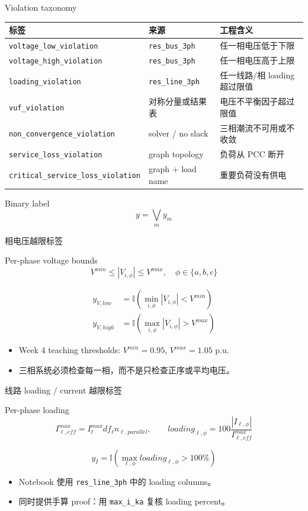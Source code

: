 \documentclass[aspectratio=169,11pt]{beamer}
\begin{document}
\begin{frame}{Violation taxonomy}
\scriptsize
\begin{tabular}{lll}
\toprule
标签 & 来源 & 工程含义 \\
\midrule
\texttt{voltage\_low\_violation} & \texttt{res\_bus\_3ph} & 任一相电压低于下限 \\
\texttt{voltage\_high\_violation} & \texttt{res\_bus\_3ph} & 任一相电压高于上限 \\
\texttt{loading\_violation} & \texttt{res\_line\_3ph} & 任一线路/相 loading 超过限值 \\
\texttt{vuf\_violation} & 对称分量或结果表 & 电压不平衡因子超过限值 \\
\texttt{non\_convergence\_violation} & solver / no slack & 三相潮流不可用或不收敛 \\
\texttt{service\_loss\_violation} & graph topology & 负荷从 PCC 断开 \\
\texttt{critical\_service\_loss\_violation} & graph + load name & 重要负荷没有供电 \\
\bottomrule
\end{tabular}
\vspace{0.3cm}

\begin{block}{Binary label}
\[
y=\bigvee_m y_m
\]
\end{block}
\end{frame}

\begin{frame}{相电压越限标签}
\begin{block}{Per-phase voltage bounds}
\[
V^{min}\le |V_{i,\phi}| \le V^{max},\quad \phi\in\{a,b,c\}
\]
\end{block}
\begin{align*}
y_{V,low}&=\mathbb{I}\left(\min_{i,\phi}|V_{i,\phi}|<V^{min}\right)\\
y_{V,high}&=\mathbb{I}\left(\max_{i,\phi}|V_{i,\phi}|>V^{max}\right)
\end{align*}
\begin{itemize}
  \item Week 4 teaching thresholds: $V^{min}=0.95$, $V^{max}=1.05$ p.u.
  \item 三相系统必须检查每一相，而不是只检查正序或平均电压。
\end{itemize}
\end{frame}

\begin{frame}{线路 loading / current 越限标签}
\begin{block}{Per-phase loading}
\[
I_{\ell,eff}^{max}=I_\ell^{max}df_\ell n_{\ell,parallel},\qquad
loading_{\ell,\phi}=100\frac{|I_{\ell,\phi}|}{I^{max}_{\ell,eff}}
\]
\end{block}
\[
y_I=\mathbb{I}\left(\max_{\ell,\phi} loading_{\ell,\phi} > 100\%\right)
\]
\begin{itemize}
  \item Notebook 使用 \texttt{res\_line\_3ph} 中的 loading columns。
  \item 同时提供手算 proof：用 \texttt{max\_i\_ka} 复核 loading percent。
\end{itemize}
\end{frame}
\end{document}
